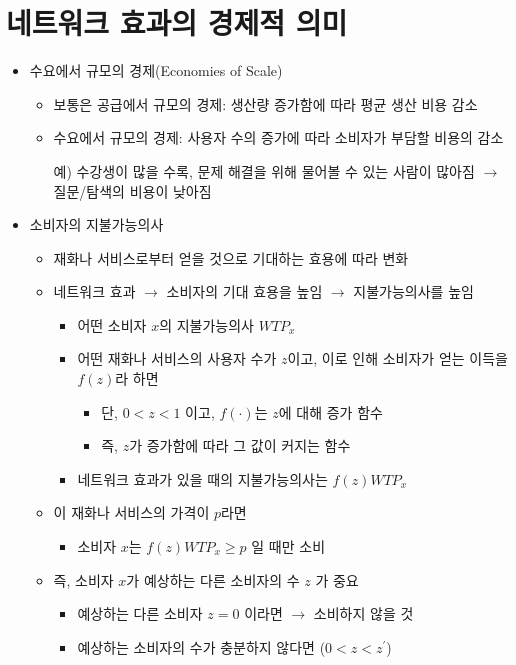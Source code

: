 \section{네트워크 효과의 경제적 의미}
\begin{itemize}
\item 수요에서 규모의 경제(Economies of Scale)
	\begin{itemize}
	\item 보통은 공급에서 규모의 경제: 생산량 증가함에 따라 평균 생산 비용 감소
	\item 수요에서 규모의 경제: 사용자 수의 증가에 따라 소비자가 부담할 비용의 감소
	\item[예)] 수강생이 많을 수록, 문제 해결을 위해 물어볼 수 있는 사람이 많아짐 $\rightarrow$ 질문/탐색의 비용이 낮아짐
	\end{itemize}
\item 소비자의 지불가능의사
	\begin{itemize}
	\item 재화나 서비스로부터 얻을 것으로 기대하는 효용에 따라 변화
	\item 네트워크 효과 $\rightarrow$ 소비자의 기대 효용을 높임 $\rightarrow$ 지불가능의사를 높임
		\begin{itemize}
		\item 어떤 소비자 $x$의 지불가능의사 $WTP_{x}$
		\item 어떤 재화나 서비스의 사용자 수가 $z$이고, 이로 인해 소비자가 얻는 이득을 $f(z)$라 하면
			\begin{itemize}
			\item 단, $0<z<1$ 이고, $f(\cdot)$는 $z$에 대해 증가 함수
			\item 즉, $z$가 증가함에 따라 그 값이 커지는 함수
			\end{itemize}
		\item 네트워크 효과가 있을 때의 지불가능의사는 $f(z)WTP_{x}$
		\end{itemize}
	\item 이 재화나 서비스의 가격이 $p$라면
		\begin{itemize}
		\item 소비자 $x$는 $f(z)WTP_{x} \geq p$ 일 때만 소비
		\end{itemize}
	\item 즉, 소비자 $x$가 예상하는 다른 소비자의 수 $z$ 가 중요
		\begin{itemize}
		\item 예상하는 다른 소비자 $z = 0$ 이라면 $\rightarrow$ 소비하지 않을 것
		\item 예상하는 소비자의 수가 충분하지 않다면 ($0< z < z^{'}$)

\end{itemize}
\end{itemize}
\end{itemize}
